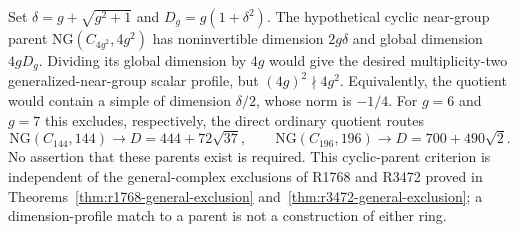 Set $\delta=g+\sqrt{g^2+1}$ and $D_g=g(1+\delta^2)$.
The hypothetical cyclic near-group parent $\mathrm{NG}(C_{4g^2},4g^2)$
has noninvertible dimension $2g\delta$ and global dimension $4gD_g$.
Dividing its global dimension by $4g$ would give the desired
multiplicity-two generalized-near-group scalar profile, but
$(4g)^2\nmid4g^2$. Equivalently, the quotient would contain a simple
of dimension $\delta/2$, whose norm is $-1/4$.
For $g=6$ and $g=7$ this excludes, respectively, the direct ordinary
quotient routes
\[
 \mathrm{NG}(C_{144},144)\longrightarrow D=444+72\sqrt{37},
 \qquad
 \mathrm{NG}(C_{196},196)\longrightarrow D=700+490\sqrt2.
\]
No assertion that these parents exist is required. This cyclic-parent
criterion is independent of the general-complex exclusions of R1768 and
R3472 proved in Theorems~\ref{thm:r1768-general-exclusion}
and~\ref{thm:r3472-general-exclusion}; a dimension-profile match to a
parent is not a construction of either ring.

